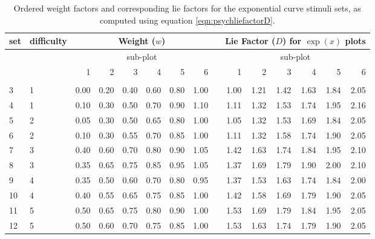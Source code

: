 \documentclass[11pt]{isuthesis}\usepackage[]{graphicx}\usepackage[]{color}
\begin{document}
\begin{table}[ht]
\centering
\caption{\label{tab:w2} Ordered weight factors and corresponding lie factors for the exponential curve stimuli sets, as computed using equation \ref{eqn:psychliefactorD}.}
     \begin{tabular}{llrrrrrrlrrrrrr}
     \hline
     set \vphantom{hp}& difficulty & \multicolumn{6}{c}{Weight ($w$)} & & \multicolumn{6}{c}{Lie Factor ($D$) for $\exp(x)$ plots}\\ 
     \hline
     & & \multicolumn{6}{c}{sub-plot} & & \multicolumn{6}{c}{sub-plot}\\ 
     & & 1 & 2 & 3 & 4 & 5 & 6  & & 1 & 2 & 3 & 4 & 5 & 6  \\ 
     \cline{3-8} \cline{10-15}\\ [-1.75ex]
     3 & 1 & 0.00 & 0.20 & 0.40 & 0.60 & 0.80 & 1.00 &  & 1.00 & 1.21 & 1.42 & 1.63 & 1.84 & 2.05 \\ 
     4 & 1 & 0.10 & 0.30 & 0.50 & 0.70 & 0.90 & 1.10 &  & 1.11 & 1.32 & 1.53 & 1.74 & 1.95 & 2.16 \\ 
     5 & 2 & 0.05 & 0.30 & 0.50 & 0.65 & 0.80 & 1.00 &  & 1.05 & 1.32 & 1.53 & 1.69 & 1.84 & 2.05 \\ 
     6 & 2 & 0.10 & 0.30 & 0.55 & 0.70 & 0.85 & 1.00 &  & 1.11 & 1.32 & 1.58 & 1.74 & 1.90 & 2.05 \\ 
     7 & 3 & 0.40 & 0.60 & 0.70 & 0.80 & 0.90 & 1.05 &  & 1.42 & 1.63 & 1.74 & 1.84 & 1.95 & 2.10 \\ 
     8 & 3 & 0.35 & 0.65 & 0.75 & 0.85 & 0.95 & 1.05 &  & 1.37 & 1.69 & 1.79 & 1.90 & 2.00 & 2.10 \\ 
     9 & 4 & 0.35 & 0.50 & 0.60 & 0.70 & 0.80 & 0.95 &  & 1.37 & 1.53 & 1.63 & 1.74 & 1.84 & 2.00 \\ 
     10 & 4 & 0.40 & 0.55 & 0.65 & 0.75 & 0.85 & 1.00 &  & 1.42 & 1.58 & 1.69 & 1.79 & 1.90 & 2.05 \\ 
     11 & 5 & 0.50 & 0.65 & 0.75 & 0.80 & 0.90 & 1.00 &  & 1.53 & 1.69 & 1.79 & 1.84 & 1.95 & 2.05 \\ 
     12 & 5 & 0.50 & 0.60 & 0.70 & 0.75 & 0.85 & 1.00 &  & 1.53 & 1.63 & 1.74 & 1.79 & 1.90 & 2.05 \\ 
     \hline
  \end{tabular}
\end{table}
\end{document}
